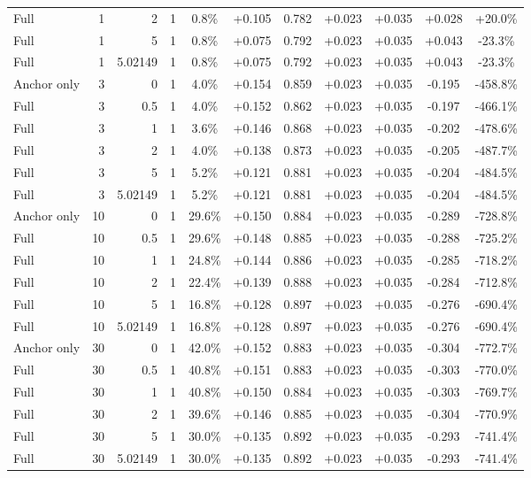\begin{table}[htbp]
\begin{tabular}{lrrrccccccc}
Full & 1 & 2 & 1 & 0.8\% & +0.105 & 0.782 & +0.023 & +0.035 & +0.028 & +20.0\% \\
Full & 1 & 5 & 1 & 0.8\% & +0.075 & 0.792 & +0.023 & +0.035 & +0.043 & -23.3\% \\
Full & 1 & 5.02149 & 1 & 0.8\% & +0.075 & 0.792 & +0.023 & +0.035 & +0.043 & -23.3\% \\
Anchor only & 3 & 0 & 1 & 4.0\% & +0.154 & 0.859 & +0.023 & +0.035 & -0.195 & -458.8\% \\
Full & 3 & 0.5 & 1 & 4.0\% & +0.152 & 0.862 & +0.023 & +0.035 & -0.197 & -466.1\% \\
Full & 3 & 1 & 1 & 3.6\% & +0.146 & 0.868 & +0.023 & +0.035 & -0.202 & -478.6\% \\
Full & 3 & 2 & 1 & 4.0\% & +0.138 & 0.873 & +0.023 & +0.035 & -0.205 & -487.7\% \\
Full & 3 & 5 & 1 & 5.2\% & +0.121 & 0.881 & +0.023 & +0.035 & -0.204 & -484.5\% \\
Full & 3 & 5.02149 & 1 & 5.2\% & +0.121 & 0.881 & +0.023 & +0.035 & -0.204 & -484.5\% \\
Anchor only & 10 & 0 & 1 & 29.6\% & +0.150 & 0.884 & +0.023 & +0.035 & -0.289 & -728.8\% \\
Full & 10 & 0.5 & 1 & 29.6\% & +0.148 & 0.885 & +0.023 & +0.035 & -0.288 & -725.2\% \\
Full & 10 & 1 & 1 & 24.8\% & +0.144 & 0.886 & +0.023 & +0.035 & -0.285 & -718.2\% \\
Full & 10 & 2 & 1 & 22.4\% & +0.139 & 0.888 & +0.023 & +0.035 & -0.284 & -712.8\% \\
Full & 10 & 5 & 1 & 16.8\% & +0.128 & 0.897 & +0.023 & +0.035 & -0.276 & -690.4\% \\
Full & 10 & 5.02149 & 1 & 16.8\% & +0.128 & 0.897 & +0.023 & +0.035 & -0.276 & -690.4\% \\
Anchor only & 30 & 0 & 1 & 42.0\% & +0.152 & 0.883 & +0.023 & +0.035 & -0.304 & -772.7\% \\
Full & 30 & 0.5 & 1 & 40.8\% & +0.151 & 0.883 & +0.023 & +0.035 & -0.303 & -770.0\% \\
Full & 30 & 1 & 1 & 40.8\% & +0.150 & 0.884 & +0.023 & +0.035 & -0.303 & -769.7\% \\
Full & 30 & 2 & 1 & 39.6\% & +0.146 & 0.885 & +0.023 & +0.035 & -0.304 & -770.9\% \\
Full & 30 & 5 & 1 & 30.0\% & +0.135 & 0.892 & +0.023 & +0.035 & -0.293 & -741.4\% \\
Full & 30 & 5.02149 & 1 & 30.0\% & +0.135 & 0.892 & +0.023 & +0.035 & -0.293 & -741.4\% \\

\end{tabular}
\end{table}

